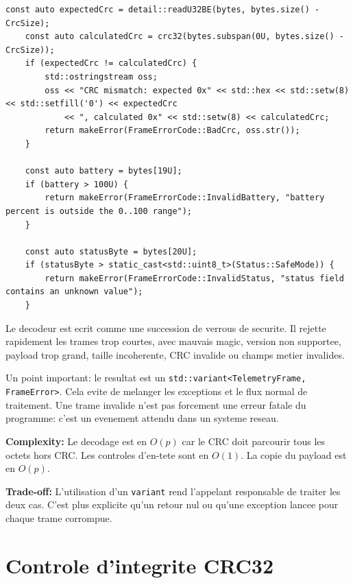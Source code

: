 \documentclass[10pt,a4paper]{article}
\newcommand{\complexity}[1]{\textbf{Complexity:} #1}
\newcommand{\tradeoff}[1]{\textbf{Trade-off:} #1}
\begin{document}
\begin{lstlisting}[caption={Decodage strict et production d erreurs metier}]
    const auto expectedCrc = detail::readU32BE(bytes, bytes.size() - CrcSize);
    const auto calculatedCrc = crc32(bytes.subspan(0U, bytes.size() - CrcSize));
    if (expectedCrc != calculatedCrc) {
        std::ostringstream oss;
        oss << "CRC mismatch: expected 0x" << std::hex << std::setw(8) << std::setfill('0') << expectedCrc
            << ", calculated 0x" << std::setw(8) << calculatedCrc;
        return makeError(FrameErrorCode::BadCrc, oss.str());
    }

    const auto battery = bytes[19U];
    if (battery > 100U) {
        return makeError(FrameErrorCode::InvalidBattery, "battery percent is outside the 0..100 range");
    }

    const auto statusByte = bytes[20U];
    if (statusByte > static_cast<std::uint8_t>(Status::SafeMode)) {
        return makeError(FrameErrorCode::InvalidStatus, "status field contains an unknown value");
    }

\end{lstlisting}


Le decodeur est ecrit comme une succession de verrous de securite. Il rejette rapidement les trames trop courtes, avec mauvais magic, version non supportee, payload trop grand, taille incoherente, CRC invalide ou champs metier invalides.

Un point important: le resultat est un \texttt{std::variant<TelemetryFrame, FrameError>}. Cela evite de melanger les exceptions et le flux normal de traitement. Une trame invalide n'est pas forcement une erreur fatale du programme: c'est un evenement attendu dans un systeme reseau.

\complexity{Le decodage est en $O(p)$ car le CRC doit parcourir tous les octets hors CRC. Les controles d'en-tete sont en $O(1)$. La copie du payload est en $O(p)$.}

\tradeoff{L'utilisation d'un \texttt{variant} rend l'appelant responsable de traiter les deux cas. C'est plus explicite qu'un retour nul ou qu'une exception lancee pour chaque trame corrompue.}

\section{Controle d'integrite CRC32}
\end{document}
